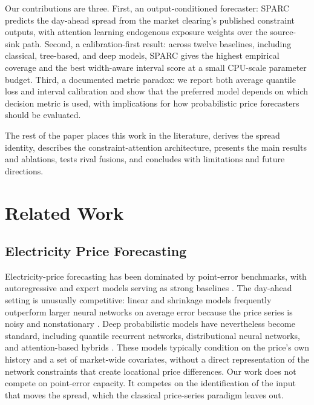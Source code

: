 \documentclass[twoside]{article}
\begin{document}
Our contributions are three. First, an output-conditioned forecaster: SPARC predicts the day-ahead spread from the market clearing's published constraint outputs, with attention learning endogenous exposure weights over the source-sink path. Second, a calibration-first result: across twelve baselines, including classical, tree-based, and deep models, SPARC gives the highest empirical coverage and the best width-aware interval score at a small CPU-scale parameter budget. Third, a documented metric paradox: we report both average quantile loss and interval calibration and show that the preferred model depends on which decision metric is used, with implications for how probabilistic price forecasters should be evaluated.

The rest of the paper places this work in the literature, derives the spread identity, describes the constraint-attention architecture, presents the main results and ablations, tests rival fusions, and concludes with limitations and future directions.

\section{Related Work}

\subsection{Electricity Price Forecasting}
Electricity-price forecasting has been dominated by point-error benchmarks, with autoregressive and expert models serving as strong baselines \citep{lago2020forecasting, uniejewski2018efficient}. The day-ahead setting is unusually competitive: linear and shrinkage models frequently outperform larger neural networks on average error because the price series is noisy and nonstationary \citep{lago2020forecasting}. Deep probabilistic models have nevertheless become standard, including quantile recurrent networks, distributional neural networks, and attention-based hybrids \citep{wen2017multihorizon, marcjasz2023distributional, lim2020temporal}. These models typically condition on the price's own history and a set of market-wide covariates, without a direct representation of the network constraints that create locational price differences. Our work does not compete on point-error capacity. It competes on the identification of the input that moves the spread, which the classical price-series paradigm leaves out.
\end{document}
